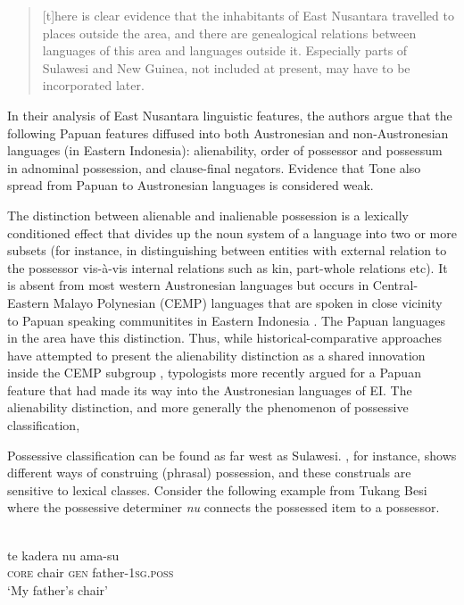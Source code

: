 \begin{quote}[t]here is clear evidence that the inhabitants of East Nusantara travelled to places outside the area, and there are genealogical relations between languages of this area and languages outside it. Especially parts of Sulawesi and New Guinea, not included at present, may have to be incorporated later.\end{quote}

In their analysis of East Nusantara linguistic features, the authors argue that the following Papuan features diffused into both Austronesian and non-Austronesian languages (in Eastern Indonesia): alienability, order of possessor and possessum in adnominal possession, and clause-final negators. Evidence that Tone also spread from Papuan to Austronesian languages is considered weak.

The distinction between alienable and inalienable possession is a lexically conditioned effect that divides up the noun system of a language into two or more subsets (for instance, in distinguishing between entities with external relation to the possessor vis-à-vis internal relations such as kin, part-whole relations etc). It is absent from most western Austronesian languages but occurs in Central-Eastern Malayo Polynesian (CEMP) languages that are spoken in close vicinity to Papuan speaking communitites in Eastern Indonesia \citep[116]{klamer2008east}. The Papuan languages in the area have this distinction. Thus, while historical-comparative approaches have attempted to present the alienability distinction as a shared innovation inside the CEMP subgroup \citep{blust1993central}, typologists more recently argued for a Papuan feature that had made its way into the Austronesian languages of EI. The alienability distinction, and more generally the phenomenon of possessive classification,  

Possessive classification can be found as far west as Sulawesi. , for instance, shows different ways of construing (phrasal) possession, and these construals are sensitive to lexical classes. Consider the following example from Tukang Besi where the possessive determiner \textit{nu} connects the possessed item to a possessor.

\ea 
{}\\
\gll te kadera nu ama-su\\
\textsc{core} chair \textsc{gen} father-\textsc{1}\textsc{sg}.\textsc{poss}\\
\glt ‘My father's chair’
\z

